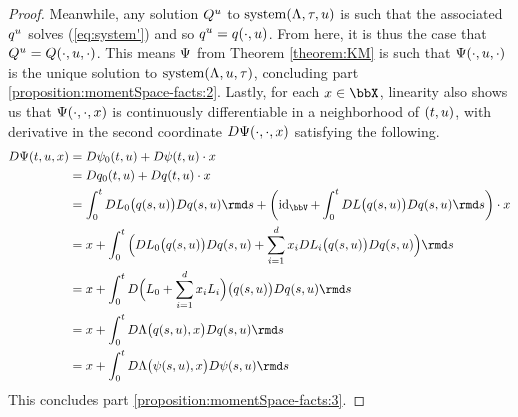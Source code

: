 \begin{proof}
  Meanwhile, any solution $Q^u$ to $\operatorname{system}(\Lambda,\tau,u)$ is such that the associated $q^u$ solves (\ref{eq:system'}) and so $q^u = q(\cdot,u)$.
  From here, it is thus the case that $Q^u = Q(\cdot,u,\cdot)$.
  This means $\Psi$ from Theorem \ref{theorem:KM} is such that $\Psi(\cdot,u,\cdot)$ is the unique solution to $\operatorname{system}(\Lambda,u,\tau)$, concluding part \ref{proposition:momentSpace-facts:2}.
  Lastly, for each $\stateVar\in\stateSpace$, linearity also shows us that $\Psi(\cdot,\cdot,x)$ is continuously differentiable in a neighborhood of $(t, u)$, with derivative in the second coordinate $D\Psi(\cdot,\cdot,x)$ satisfying the following.
  \begin{align*}
    D\aff(t,\momentVar,\stateVar)
    &= D\affPart_0(t,\momentVar) + D\affPart(t,\momentVar)\cdot\stateVar \\
    &= D q_0(t,\momentVar) + Dq(t,\momentVar)\cdot\stateVar \\
    &= \int_0^t D\odePart_0\big(q(s,\momentVar)\big) Dq(s,\momentVar) \rmd s + \left(\operatorname{id}_\vecSpace + \int_0^t D\odePart\big(q(s,\momentVar)\big)D q(s,\momentVar) \rmd s\right)\cdot\stateVar \\
    &= \stateVar + \int_0^t \Big( D\odePart_0\big(q(s,\momentVar) \big) Dq(s,\momentVar) + \sum_{i=1}^d \stateVar_i D\odePart_i\big(q(s,\momentVar) \big) Dq(s,\momentVar) \Big) \rmd s \\
    &= \stateVar + \int_0^t D\Big( \odePart_0 + \sum_{i=1}^d \stateVar_i \odePart_i \Big)\big(q(s,\momentVar)\big) Dq(s,\momentVar)  \rmd s \\
    &= \stateVar + \int_0^t D\ode\big(q(s,\momentVar), \stateVar\big) Dq(s,\momentVar)  \rmd s \\
    &= \stateVar + \int_0^t D\ode\big(\affPart(s,\momentVar), \stateVar\big) D\affPart(s,\momentVar) \rmd s 
  \end{align*}
  This concludes part \ref{proposition:momentSpace-facts:3}.
\end{proof}
